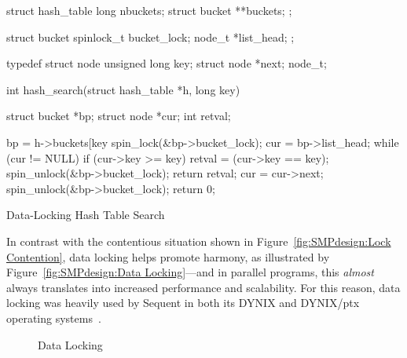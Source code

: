 \begin{listing}[tb]
\begin{VerbatimL}
struct hash_table
{
	long nbuckets;
	struct bucket **buckets;
};

struct bucket {
	spinlock_t bucket_lock;
	node_t *list_head;
};

typedef struct node {
	unsigned long key;
	struct node *next;
} node_t;

int hash_search(struct hash_table *h, long key)
{
	struct bucket *bp;
	struct node *cur;
	int retval;

	bp = h->buckets[key %
	spin_lock(&bp->bucket_lock);
	cur = bp->list_head;
	while (cur != NULL) {
		if (cur->key >= key) {
			retval = (cur->key == key);
			spin_unlock(&bp->bucket_lock);
			return retval;
		}
		cur = cur->next;
	}
	spin_unlock(&bp->bucket_lock);
	return 0;
}
\end{VerbatimL}
\caption{Data-Locking Hash Table Search}
\label{lst:SMPdesign:Data-Locking Hash Table Search}
\end{listing}

In contrast with the contentious situation
shown in Figure~\ref{fig:SMPdesign:Lock Contention},
data locking helps promote harmony, as illustrated by
Figure~\ref{fig:SMPdesign:Data Locking}---and in parallel programs,
this \emph{almost} always translates into increased performance and
scalability.
For this reason, data locking was heavily used by Sequent in
both its DYNIX and DYNIX/ptx operating
systems~\cite{Beck85,Inman85,Garg90,Dove90,McKenney92b,McKenney92a,McKenney93}.

\begin{figure}[tbh]
\centering
{}
\caption{Data Locking}
\end{figure}


